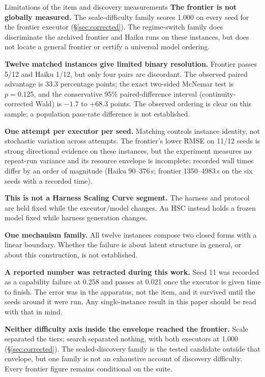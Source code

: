 \begin{cautionbox}{Limitations of the item and discovery measurements}
\textbf{The frontier is not globally measured.} The scale-difficulty family scores 1.000 on every seed for the frontier executor (\S\ref{sec:corrected}). The regime-switch family does discriminate the archived frontier and Haiku runs on these instances, but does not locate a general frontier or certify a universal model ordering.

\textbf{Twelve matched instances give limited binary resolution.} Frontier passes 5/12 and Haiku 1/12, but only four pairs are discordant. The observed paired advantage is 33.3 percentage points; the exact two-sided McNemar test is $p=0.125$, and the conservative 95\% paired-difference interval (continuity-corrected Wald) is $-1.7$ to $+68.3$ points. The observed ordering is clear on this sample; a population pass-rate difference is not established.

\textbf{One attempt per executor per seed.} Matching controls instance identity, not stochastic variation across attempts. The frontier's lower RMSE on 11/12 seeds is strong directional evidence on these instances, but the experiment measures no repeat-run variance and its resource envelope is incomplete: recorded wall times differ by an order of magnitude (Haiku 90--376\,s; frontier 1350--4983\,s on the six seeds with a recorded time).

\textbf{This is not a Harness Scaling Curve segment.} The harness and protocol are held fixed while the executor/model changes. An HSC instead holds a frozen model fixed while harness generation changes.

\textbf{One mechanism family.} All twelve instances compose two closed forms with a linear boundary. Whether the failure is about latent structure in general, or about this construction, is not established.

\textbf{A reported number was retracted during this work.} Seed 11 was recorded as a capability failure at 0.258 and passes at 0.021 once the executor is given time to finish. The error was in the apparatus, not the item, and it survived until the seeds around it were run. Any single-instance result in this paper should be read with that in mind.

\textbf{Neither difficulty axis inside the envelope reached the frontier.} Scale separated the tiers; search separated nothing, with both executors at 1.000 (\S\ref{sec:corrected}). The sealed-discovery family is the tested candidate outside that envelope, but one family is not an exhaustive account of discovery difficulty. Every frontier figure remains conditional on the suite.


\end{cautionbox}
